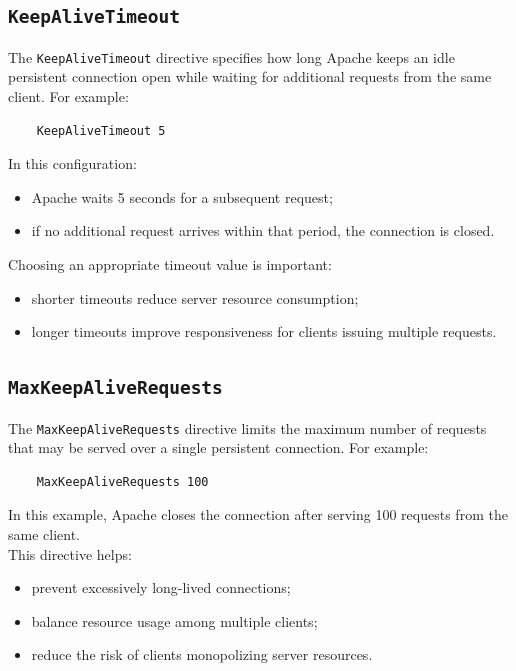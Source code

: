\documentclass{scrbook}
\begin{document}
	\subsection{\texttt{KeepAliveTimeout}}
	
	The \texttt{KeepAliveTimeout} directive specifies how long Apache keeps an idle persistent connection open while waiting for additional requests from the same client. For example:
	\begin{lstlisting}
	KeepAliveTimeout 5
	\end{lstlisting}
	
	In this configuration:
	\begin{itemize}
		\item Apache waits 5 seconds for a subsequent request;
		\item if no additional request arrives within that period, the connection is closed.
	\end{itemize}
	
	Choosing an appropriate timeout value is important:
	\begin{itemize}
		\item shorter timeouts reduce server resource consumption;
		\item longer timeouts improve responsiveness for clients issuing multiple requests.
	\end{itemize}
	
	\subsection{\texttt{MaxKeepAliveRequests}}
	
	The \texttt{MaxKeepAliveRequests} directive limits the maximum number of requests that may be served over a single persistent connection. For example:
	\begin{lstlisting}
	MaxKeepAliveRequests 100
	\end{lstlisting}
	
	In this example, Apache closes the connection after serving 100 requests from the same client.\\
	
	This directive helps:
	\begin{itemize}
		\item prevent excessively long-lived connections;
		\item balance resource usage among multiple clients;
		\item reduce the risk of clients monopolizing server resources.
	\end{itemize}
	
\end{document}

